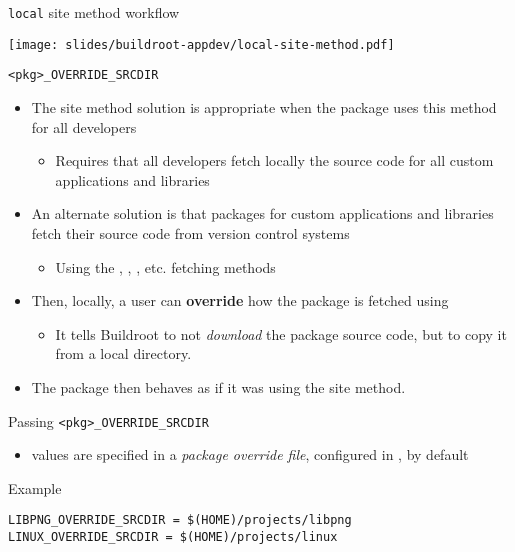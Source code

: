 \begin{frame}{{\tt local} site method workflow}
  \begin{center}
    \texttt{[image: slides/buildroot-appdev/local-site-method.pdf]}
  \end{center}
\end{frame}

\begin{frame}{{\tt <pkg>\_OVERRIDE\_SRCDIR}}
  \begin{itemize}
  \item The  site method solution is appropriate when the
    package uses this method for all developers
    \begin{itemize}
    \item Requires that all developers fetch locally the source code
      for all custom applications and libraries
    \end{itemize}
  \item An alternate solution is that packages for custom applications
    and libraries fetch their source code from version control systems
    \begin{itemize}
    \item Using the , , , etc. fetching
      methods
    \end{itemize}
  \item Then, locally, a user can {\bf override} how the package is
    fetched using 
    \begin{itemize}
    \item It tells Buildroot to not {\em download} the package source
      code, but to copy it from a local directory.
    \end{itemize}
  \item The package then behaves as if it was using the 
    site method.
  \end{itemize}
\end{frame}

\begin{frame}[fragile]{Passing {\tt <pkg>\_OVERRIDE\_SRCDIR}}
  \begin{itemize}
  \item {} values are specified in a {\em
      package override file}, configured in
    , by default
  \end{itemize}

  \begin{block}{Example }
\begin{verbatim}
LIBPNG_OVERRIDE_SRCDIR = $(HOME)/projects/libpng
LINUX_OVERRIDE_SRCDIR = $(HOME)/projects/linux
\end{verbatim}
  \end{block}
\end{frame}

